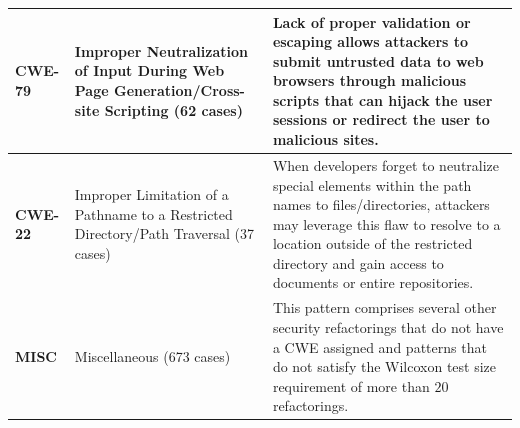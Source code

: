 \documentclass[sigconf,review]{acmart}
\begin{document}
\begin{table}[h]
\begin{tabular}{L{1.1cm}L{2.1cm}L{4.3cm}}
 	     	           \textbf{CWE-79} & 
Improper Neutralization of Input During Web Page Generation/Cross-site Scripting (62 cases)& 
Lack of proper validation or escaping
 	    allows attackers to submit untrusted data to web browsers through malicious
 	    scripts that can hijack the user sessions or redirect the user to malicious
 	    sites.\\\midrule

 	     	           \textbf{CWE-22} & 
Improper Limitation of a Pathname to a Restricted Directory/Path Traversal (37 cases) & 
When developers forget to neutralize special elements within the path names to files/directories, attackers
 	may leverage this flaw to resolve to a location outside of the restricted directory and gain access to documents
 	or entire repositories.\\\midrule
 	
 	 	     	           \textbf{MISC} & 
Miscellaneous (673 cases) & 
This pattern comprises
 		several other security refactorings that do not have a CWE assigned and patterns that
 		do not satisfy the Wilcoxon test size requirement of more than $20$ refactorings.\\
\bottomrule
\end{tabular}
\label{tab:patterns}
\end{table}
\end{document}

